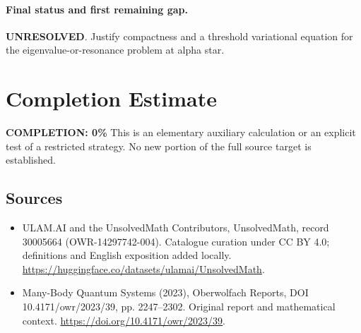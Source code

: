 \documentclass[11pt]{article}
\begin{document}
\paragraph{Final status and first remaining gap.}
\textbf{UNRESOLVED}. Justify compactness and a threshold variational equation for the eigenvalue-or-resonance problem at alpha star.

\section{Completion Estimate}
\noindent\textbf{COMPLETION: 0\%}
This is an elementary auxiliary calculation or an explicit test of a restricted strategy. No new portion of the full source target is established.

\subsection{Sources}
\begin{itemize}
\item[\hypertarget{source:30005664:1}{S1}] ULAM.AI and the UnsolvedMath Contributors, UnsolvedMath, record 30005664 (OWR-14297742-004). Catalogue curation under CC BY 4.0; definitions and English exposition added locally.
\url{https://huggingface.co/datasets/ulamai/UnsolvedMath}.
\item[\hypertarget{source:30005664:2}{S2}] Many-Body Quantum Systems (2023), Oberwolfach Reports, DOI 10.4171/owr/2023/39, pp. 2247--2302. Original report and mathematical context.
\url{https://doi.org/10.4171/owr/2023/39}.
\end{itemize}
\label{end:30005664}
\end{document}
